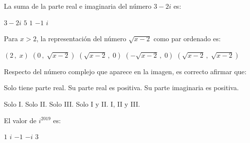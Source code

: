 \documentclass[]{srs}
\begin{document}
\begin{preguntas}[after-item-skip=2cm]
 \pregunta La suma de la parte real e imaginaria del número $3-2i$ es:\\
 \begin{vertical}
 \alternativa $3-2i$
 \alternativa $5$
 \alternativa $1$
 \alternativa $-1$
 \alternativa $i$
 \end{vertical}

 \pregunta Para $x > 2$, la representación del número $\sqrt{x-2}$ como par ordenado es:\\
\begin{vertical}
  \alternativa $\left(2\,,\;x\right)$
  \alternativa $\left(0\,,\;\sqrt{x-2}\right)$
  \alternativa $\left(\sqrt{x-2}\,,\;0\right)$
  \alternativa $\left(-\sqrt{x-2}\,,\;0\right)$
  \alternativa $\left(\sqrt{x-2}\,,\;\sqrt{x-2}\right)$
\end{vertical}

 \pregunta Respecto del número complejo que aparece en la imagen, es correcto
 afirmar que:\\
\begin{center}
\end{center}
\begin{vertical*}
  \alternativa Solo tiene parte real.
  \alternativa Su parte real es positiva.
  \alternativa Su parte imaginaria es positiva.
\end{vertical*}
\begin{vertical}
  \alternativa Solo I.
  \alternativa Solo II.
  \alternativa Solo III.
  \alternativa Solo I y II.
  \alternativa I, II y III.
\end{vertical}

\pregunta El valor de $i^{2019}$ es:\\
\begin{vertical}
\alternativa $1$
\alternativa $i$
\alternativa $-1$
\alternativa $-i$
\alternativa $3$
\end{vertical}


\end{preguntas}
\end{document}
